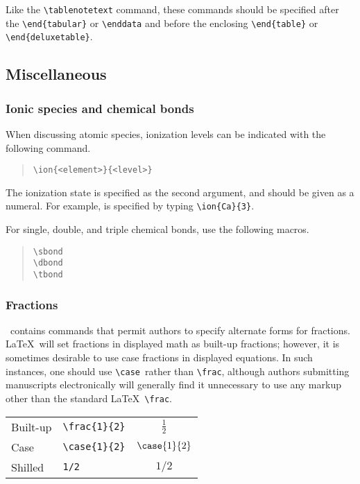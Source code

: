 \documentclass[preprint2]{aastex}
\begin{document}
Like the \verb"\tablenotetext" command, these commands should be 
 specified after the \verb"\end{tabular}" or \verb"\enddata" and before 
the enclosing \verb"\end{table}" or \verb"\end{deluxetable}". 
 
\subsection{Miscellaneous} 
 
\subsubsection{Ionic species and chemical bonds} 
 
When discussing atomic species, ionization levels can be indicated 
with the following command. 
\begin{quote} 
\begin{verbatim} 
\ion{<element>}{<level>} 
\end{verbatim} 
\end{quote} 
The ionization state is specified as the second argument, 
and should be given as a numeral. 
For example,  is specified by typing \verb"\ion{Ca}{3}". 
 
For single, double, and triple chemical bonds, use the following macros. 
\begin{quote} 
\begin{verbatim} 
\sbond 
\dbond 
\tbond 
\end{verbatim} 
\end{quote} 
 
 
 
 
\subsubsection{Fractions} 
 
\aastex\ contains commands that permit authors to specify alternate 
forms for fractions. 
\LaTeX\ will set fractions in displayed math as built-up fractions; 
however, it is sometimes desirable to use case fractions in 
displayed equations. 
In such instances, one should use \verb"\case"\ 
rather than \verb"\frac", although authors submitting 
manuscripts electronically 
will generally find it unnecessary to use any markup other than the 
standard \LaTeX\ \verb"\frac". 
 
\begin{center} 
\renewcommand{\arraystretch}{1.4} 
\begin{tabular}{@{}llc@{}} 
Built-up & \verb"\frac{1}{2}" & $\displaystyle\frac{1}{2}$ \\[.5ex] 
Case     & \verb"\case{1}{2}" & $\case{1}{2}$ \\ 
Shilled  & \verb"1/2" & $1/2$ \\ 
\end{tabular} 
\end{center} 
 
\end{document}
